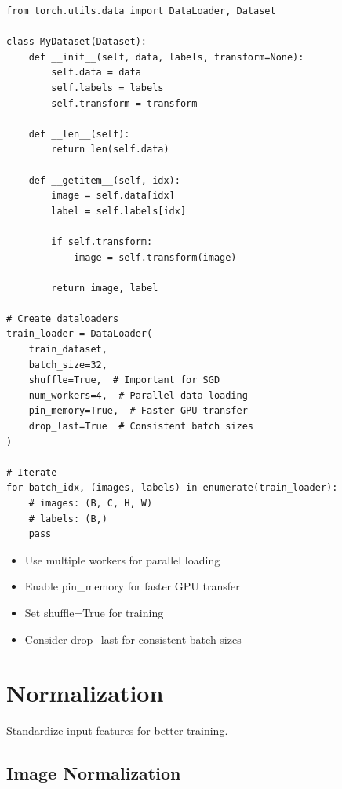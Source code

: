 \begin{code}
    \label{code:dataloader}
\begin{verbatim}
from torch.utils.data import DataLoader, Dataset

class MyDataset(Dataset):
    def __init__(self, data, labels, transform=None):
        self.data = data
        self.labels = labels
        self.transform = transform
    
    def __len__(self):
        return len(self.data)
    
    def __getitem__(self, idx):
        image = self.data[idx]
        label = self.labels[idx]
        
        if self.transform:
            image = self.transform(image)
        
        return image, label

# Create dataloaders
train_loader = DataLoader(
    train_dataset,
    batch_size=32,
    shuffle=True,  # Important for SGD
    num_workers=4,  # Parallel data loading
    pin_memory=True,  # Faster GPU transfer
    drop_last=True  # Consistent batch sizes
)

# Iterate
for batch_idx, (images, labels) in enumerate(train_loader):
    # images: (B, C, H, W)
    # labels: (B,)
    pass
\end{verbatim}
\end{code}

\begin{properties}
\begin{itemize}
    \item Use multiple workers for parallel loading
    \item Enable pin\_memory for faster GPU transfer
    \item Set shuffle=True for training
    \item Consider drop\_last for consistent batch sizes
\end{itemize}
\end{properties}

\section{Normalization}

Standardize input features for better training.

\subsection{Image Normalization}


